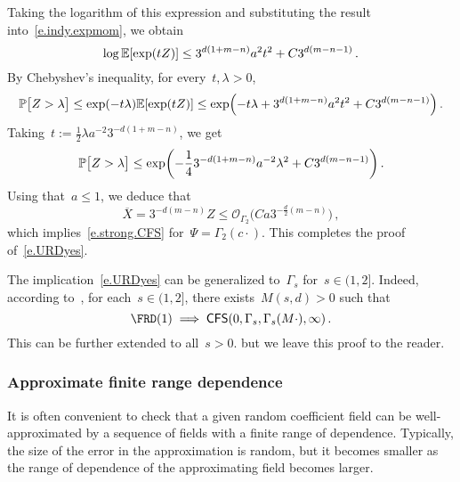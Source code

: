 \documentclass[11pt,twoside]{article} %
\numberwithin{equation}{section}
\theoremstyle{definition}
\let\originalleft\left
\let\originalright\right
\renewcommand{\left}{\mathopen{}\mathclose\bgroup\originalleft}
\renewcommand{\right}{\aftergroup\egroup\originalright}
\renewcommand{\P}{\mathbb{P}}
\newcommand{\E}{\mathbb{E}}
\renewcommand{\O}{\mathcal{O}}
\newcommand{\CFS}{\mathsf{CFS}}
\begin{document}
Taking the logarithm of this expression and substituting the result into~\eqref{e.indy.expmom}, we obtain 
\begin{equation*}
\log \E \left[ \exp\left( tZ\right) \right]
\leq 
3^{d(1+m-n)} a^2 t^2 + C 3^{d(m-n-1)} 
\,.
\end{equation*}
By Chebyshev's inequality, for every~$t,\lambda>0$, 
\begin{align*}
\P \bigl[ Z > \lambda \bigr]
\leq 
\exp\left( -t\lambda \right)
\E \left[  \exp \left( t Z \right) \right]
\leq 
\exp\left( -t\lambda + 3^{d(1+m-n)} a^2 t^2 + C3^{d(m-n-1)} \right)\,.
\end{align*}
Taking~$t:= \frac12 \lambda a^{-2} 3^{-d(1+m-n)}$, we get
\begin{equation} 
\label{e.unitrange.result}
\P \bigl[ Z > \lambda \bigr]
\leq
\exp\left( -\frac14 3^{-d(1+m-n)} a^{-2} \lambda^2 + C3^{d(m-n-1)} \right)\,.
\end{equation}
Using that~$a\leq 1$, we deduce that
\begin{equation*}
\overline{X} = 
3^{-d(m-n)} Z 
\leq 
\O_{\Gamma_2}\bigl(Ca 3^{-\frac d2(m-n)} \bigr) \,,
\end{equation*}
which implies~\eqref{e.strong.CFS} for~$\Psi = \Gamma_2(c\cdot)$. This completes the proof of~\eqref{e.URDyes}. 

\smallskip

The implication~\eqref{e.URDyes} can be generalized to~$\Gamma_s$ for~$s \in (1,2]$. Indeed, according to~\cite[Lemma A.9 \& A.12]{AKMBook}, for each~$s\in (1,2]$, there exists~$M(s,d)>0$ such that 
\begin{equation}
\label{e.URDyes.s}
\FRD(1) \implies \CFS(0,\Gamma_s,\Gamma_s(M \cdot),\infty) \,.
\end{equation}
This can be further extended to all~$s> 0$. but we leave this proof to the reader. 

\subsubsection{Approximate finite range dependence}
\label{ss.AFRD}
It is often convenient to check that a given random coefficient field can be well-approximated by a sequence of fields with a finite range of dependence. Typically, the size of the error in the approximation is random, but it becomes smaller as the range of dependence of the approximating field becomes larger.  

\smallskip
\end{document}
